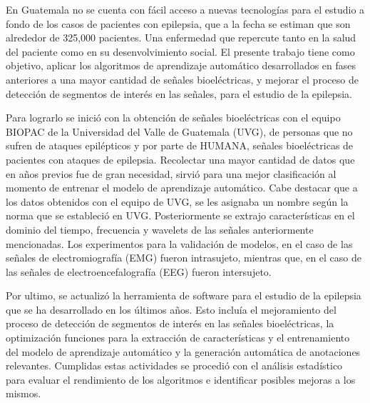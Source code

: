 


En Guatemala no se cuenta con fácil acceso a nuevas tecnologías para el estudio a fondo de los casos de pacientes con epilepsia, que a la fecha se estiman que son alrededor de 325,000 pacientes. Una enfermedad que repercute tanto en la salud del paciente como en su desenvolvimiento social. 
El presente trabajo tiene como objetivo, aplicar los algoritmos de aprendizaje automático desarrollados en fases anteriores a una mayor cantidad de señales bioeléctricas, y mejorar el proceso de detección de segmentos de interés en las señales, para el estudio de la epilepsia.

Para lograrlo se inició con la obtención de señales bioeléctricas con el equipo BIOPAC de la Universidad del Valle de Guatemala (UVG), de personas que no sufren de ataques epilépticos y por parte de HUMANA, señales bioeléctricas de pacientes con ataques de epilepsia.
Recolectar una mayor cantidad de datos que en años previos fue de gran necesidad, sirvió para una mejor clasificación al momento de entrenar el modelo de aprendizaje automático. Cabe destacar que a los datos obtenidos con el equipo de UVG, se les asignaba un nombre según la norma que se estableció en UVG. Posteriormente se extrajo características en el dominio del tiempo, frecuencia y wavelets de las señales anteriormente mencionadas. Los experimentos para la validación de modelos, en el caso de las señales de electromiografía (EMG) fueron intrasujeto, mientras que, en el caso de las señales de electroencefalografía (EEG) fueron intersujeto. 

Por ultimo, se actualizó la herramienta de software para el estudio de la epilepsia que se ha desarrollado en los últimos años. Esto incluía el mejoramiento del proceso de detección de segmentos de interés en las señales bioeléctricas, la optimización funciones para la extracción de características y el entrenamiento del modelo de aprendizaje automático y la generación automática de anotaciones relevantes. Cumplidas estas actividades se procedió con el análisis estadístico  para evaluar el rendimiento de los algoritmos e identificar posibles mejoras a los mismos.